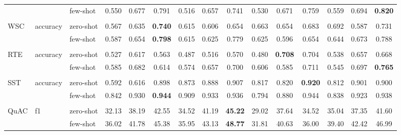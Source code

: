\begin{tabular}{lll<{\hspace{0.8 ex}}>{\hspace{0.8 ex}}ccc<{\hspace{0.8 ex}}>{\hspace{0.8 ex}}ccc<{\hspace{0.8 ex}}>{\hspace{0.8 ex}}ccc<{\hspace{0.8 ex}}>{\hspace{0.8 ex}}ccc<{\hspace{0.8 ex}}}
                           &             & few-shot      & 0.550 & 0.677 & 0.791 &  0.516 &  0.657 & 0.741 &  0.530 & 0.671 & 0.759 &  0.559 &  0.694 & \textbf{0.820}  \\
                           &             &               &       &       &       &        &        &       &        &       &       &        &        &       \\
    WSC                    & accuracy    & zero-shot     & 0.567 & 0.635 & \textbf{0.740} &  0.615 &  0.606 & 0.654 &  0.663 & 0.654 & 0.683 &  0.692 &  0.587 & 0.731 \\
                           &             & few-shot      & 0.587 & 0.654 & \textbf{0.798} &  0.615 &  0.625 & 0.779 &  0.625 & 0.596 & 0.654 &  0.644 &  0.673 & 0.788 \\
                           &             &               &       &       &       &        &        &       &        &       &       &        &        &       \\
    RTE                    & accuracy    & zero-shot     & 0.527 & 0.617 & 0.563 &  0.487 &  0.516 & 0.570 &  0.480 & \textbf{0.708} & 0.704 &  0.538 &  0.657 & 0.668 \\
                           &             & few-shot      & 0.585 & 0.682 & 0.614 &  0.574 &  0.657 & 0.700 &  0.606 & 0.585 & 0.711 &  0.545 &  0.697 & \textbf{0.765}  \\
                           &             &               &       &       &       &        &        &       &        &       &       &        &        &       \\
    SST                    & accuracy    & zero-shot     & 0.592 & 0.616 & 0.898 &  0.873 &  0.888 & 0.907 &  0.817 & 0.820 & \textbf{0.920} &  0.812 &  0.901 & 0.900 \\
                           &             & few-shot      & 0.842 & 0.930 & \textbf{0.944} &  0.909 &  0.933 & 0.936 &  0.794 & 0.880 & 0.944 &  0.838 &  0.923 & 0.938 \\
                           &             &               &       &       &       &        &        &       &        &       &       &        &        &       \\
    QuAC                   & f1          & zero-shot     & 32.13 & 38.19 & 42.55 &  34.52 &  41.19 & \textbf{45.22} &  29.02 & 37.64 & 34.52 &  35.04 &  37.35 & 41.60 \\
                           &             & few-shot      & 36.02 & 41.78 & 45.38 &  35.95 &  43.13 & \textbf{48.77} &  31.81 & 40.63 & 36.00 &  39.40 &  42.42 & 46.99 \\

\end{tabular}
